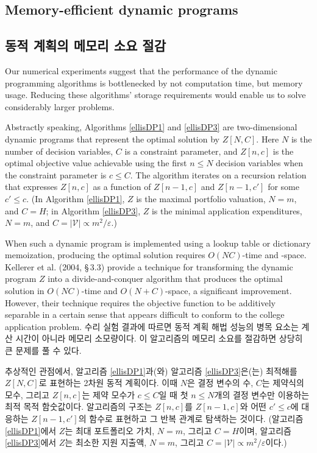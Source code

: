 \documentclass[11pt]{article} %
\theoremstyle{definition}
\theoremstyle{definition}
\begin{document}
\ifen \subsection{Memory-efficient dynamic programs}\else \subsection{동적 계획의 메모리 소요 절감}\fi
\ifen
Our numerical experiments suggest that the performance of the dynamic programming algorithms is bottlenecked by not computation time, but memory usage. Reducing these algorithms' storage requirements would enable us to solve considerably larger problems.

Abstractly speaking, Algorithms \ref{ellisDP1} and \ref{ellisDP3} are two-dimensional dynamic programs that represent the optimal solution by $Z[N, C]$. Here $N$ is the number of decision variables, $C$ is a constraint parameter, and $Z[n, c]$ is the optimal objective value achievable using the first $n\leq N$ decision variables when the constraint parameter is $c \leq C$. The algorithm iterates on a recursion relation that expresses $Z[n, c]$ as a function of $Z[n -1, c]$ and $Z[n -1, c']$ for some $c' \leq c$. (In Algorithm \ref{ellisDP1}, $Z$ is the maximal portfolio valuation, $N = m$, and $C =H$; in Algorithm \ref{ellisDP3},  $Z$ is the minimal application expenditures, $N = m$, and $C = |\mathcal{V}| \propto m^2 / \varepsilon$.)

When such a dynamic program is implemented using a lookup table or dictionary memoization, producing the optimal solution requires $O(NC)$-time and -space. Kellerer et al. (2004, \S\,3.3) provide a technique for transforming the dynamic program $Z$ into a divide-and-conquer algorithm that produces the optimal solution in $O(N C)$-time and $O(N + C)$-space, a significant improvement. However, their technique requires the objective function to be additively separable in a certain sense that appears difficult to conform to the college application problem. 
\else
수리 실험 결과에 따르면 동적 계획 해법 성능의 병목 요소는 계산 시간이 아니라 메모리 소모량이다. 이 알고리즘의 메모리 소요를 절감하면 상당히 큰 문제를 풀 수 있다.

추상적인 관점에서, 알고리즘 \ref{ellisDP1}과(와) 알고리즘 \ref{ellisDP3}은(는) 최적해를 $Z[N, C]$로 표현하는 2차원 동적 계획이다. 이때 $N$은 결정 변수의 수, $C$는 제약식의 모수, 그리고 $Z[n, c]$는 제약 모수가 $c \leq C$일 때 첫 $n\leq N$개의 결정 변수만 이용하는 최적 목적 함숫값이다. 알고리즘의 구조는 $Z[n, c]$를 $Z[n -1, c]$와 어떤 $c' \leq c$에 대응하는 $Z[n -1, c']$의 함수로 표현하고 그 반복 관계로 탐색하는 것이다. (알고리즘 \ref{ellisDP1}에서 $Z$는 최대 포트폴리오 가치, $N = m$, 그리고 $C =H$이며, 알고리즘 \ref{ellisDP3}에서 $Z$는 최소한 지원 지출액, $N = m$, 그리고 $C= |\mathcal{V}| \propto m^2 / \varepsilon$이다.)
\end{document}
